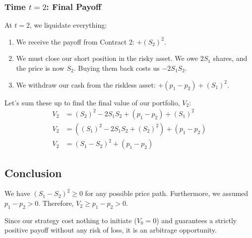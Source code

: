 \subsubsection*{Time $t=2$: Final Payoff}
At $t=2$, we liquidate everything:
\begin{enumerate}
    \item We receive the payoff from Contract 2: $+(S_2)^2$.
    \item We must close our short position in the risky asset. We owe $2S_1$ shares, and the price is now $S_2$. Buying them back costs us $-2S_1S_2$.
    \item We withdraw our cash from the riskless asset: $+(p_1 - p_2) + (S_1)^2$.
\end{enumerate}
Let's sum these up to find the final value of our portfolio, $V_2$:
\begin{align}
    V_2 &= (S_2)^2 - 2S_1S_2 + (p_1 - p_2) + (S_1)^2 \\
    V_2 &= \left( (S_1)^2 - 2S_1S_2 + (S_2)^2 \right) + (p_1 - p_2) \\
    V_2 &= (S_1 - S_2)^2 + (p_1 - p_2)
\end{align}

\subsection{Conclusion}
We have $(S_1 - S_2)^2 \ge 0$ for any possible price path. Furthermore, we assumed $p_1 - p_2 > 0$. 
Therefore, $V_2 \ge p_1 - p_2 > 0$. 

Since our strategy cost nothing to initiate ($V_0 = 0$) and guarantees a strictly positive payoff without any risk of loss, it is an arbitrage opportunity.
